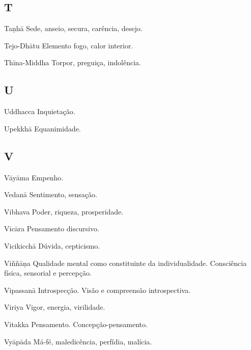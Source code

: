 \subsection{T}

\begin{glossarydescription}

\item[Taṇhā] Sede, anseio, secura, carência, desejo.

\item[Tejo-Dhātu] Elemento fogo, calor interior.

\item[Thīna-Middha] Torpor, preguiça, indolência.

\end{glossarydescription}

\subsection{U}

\begin{glossarydescription}

\item[Uddhacca] Inquietação.

\item[Upekkhā] Equanimidade.

\end{glossarydescription}

\subsection{V}

\begin{glossarydescription}

\item[Vāyāma] Empenho.

\item[Vedanā] Sentimento, sensação.

\item[Vibhava] Poder, riqueza, prosperidade.

\item[Vicāra] Pensamento discursivo.

\item[Vicikicchā] Dúvida, cepticismo.

\item[Viññāṇa] Qualidade mental como constituinte da individualidade.
Consciência física, sensorial e percepção.

\item[Vipassanā] Introspecção. Visão e compreensão introspectiva.

\item[Viriya] Vigor, energia, virilidade.

\item[Vitakka] Pensamento. Concepção-pensamento.

\item[Vyāpāda] Má-fé, maledicência, perfídia, malícia.

\end{glossarydescription}
